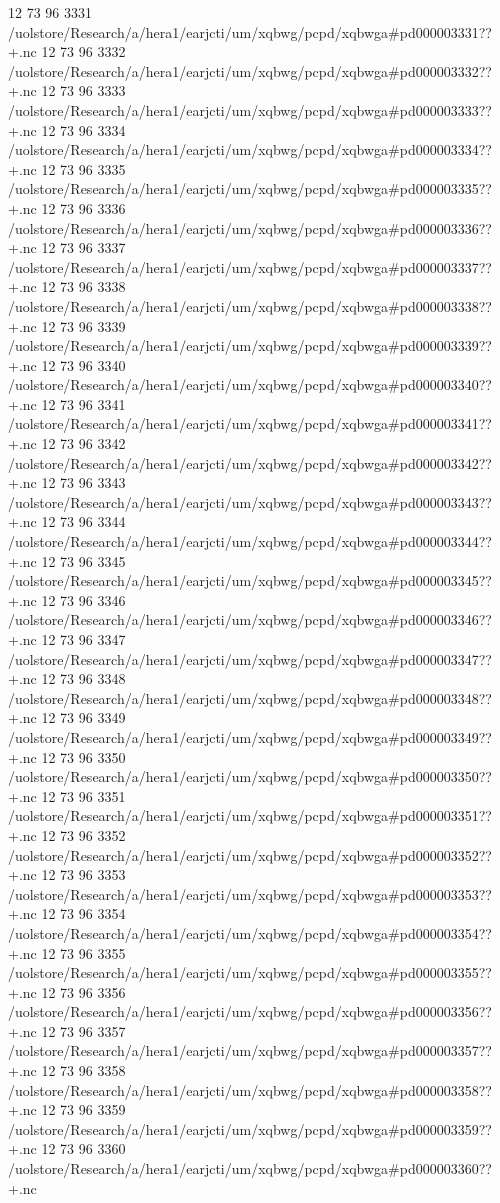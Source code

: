 12 73 96
3331
/uolstore/Research/a/hera1/earjcti/um/xqbwg/pcpd/xqbwga#pd000003331??+.nc
12 73 96
3332
/uolstore/Research/a/hera1/earjcti/um/xqbwg/pcpd/xqbwga#pd000003332??+.nc
12 73 96
3333
/uolstore/Research/a/hera1/earjcti/um/xqbwg/pcpd/xqbwga#pd000003333??+.nc
12 73 96
3334
/uolstore/Research/a/hera1/earjcti/um/xqbwg/pcpd/xqbwga#pd000003334??+.nc
12 73 96
3335
/uolstore/Research/a/hera1/earjcti/um/xqbwg/pcpd/xqbwga#pd000003335??+.nc
12 73 96
3336
/uolstore/Research/a/hera1/earjcti/um/xqbwg/pcpd/xqbwga#pd000003336??+.nc
12 73 96
3337
/uolstore/Research/a/hera1/earjcti/um/xqbwg/pcpd/xqbwga#pd000003337??+.nc
12 73 96
3338
/uolstore/Research/a/hera1/earjcti/um/xqbwg/pcpd/xqbwga#pd000003338??+.nc
12 73 96
3339
/uolstore/Research/a/hera1/earjcti/um/xqbwg/pcpd/xqbwga#pd000003339??+.nc
12 73 96
3340
/uolstore/Research/a/hera1/earjcti/um/xqbwg/pcpd/xqbwga#pd000003340??+.nc
12 73 96
3341
/uolstore/Research/a/hera1/earjcti/um/xqbwg/pcpd/xqbwga#pd000003341??+.nc
12 73 96
3342
/uolstore/Research/a/hera1/earjcti/um/xqbwg/pcpd/xqbwga#pd000003342??+.nc
12 73 96
3343
/uolstore/Research/a/hera1/earjcti/um/xqbwg/pcpd/xqbwga#pd000003343??+.nc
12 73 96
3344
/uolstore/Research/a/hera1/earjcti/um/xqbwg/pcpd/xqbwga#pd000003344??+.nc
12 73 96
3345
/uolstore/Research/a/hera1/earjcti/um/xqbwg/pcpd/xqbwga#pd000003345??+.nc
12 73 96
3346
/uolstore/Research/a/hera1/earjcti/um/xqbwg/pcpd/xqbwga#pd000003346??+.nc
12 73 96
3347
/uolstore/Research/a/hera1/earjcti/um/xqbwg/pcpd/xqbwga#pd000003347??+.nc
12 73 96
3348
/uolstore/Research/a/hera1/earjcti/um/xqbwg/pcpd/xqbwga#pd000003348??+.nc
12 73 96
3349
/uolstore/Research/a/hera1/earjcti/um/xqbwg/pcpd/xqbwga#pd000003349??+.nc
12 73 96
3350
/uolstore/Research/a/hera1/earjcti/um/xqbwg/pcpd/xqbwga#pd000003350??+.nc
12 73 96
3351
/uolstore/Research/a/hera1/earjcti/um/xqbwg/pcpd/xqbwga#pd000003351??+.nc
12 73 96
3352
/uolstore/Research/a/hera1/earjcti/um/xqbwg/pcpd/xqbwga#pd000003352??+.nc
12 73 96
3353
/uolstore/Research/a/hera1/earjcti/um/xqbwg/pcpd/xqbwga#pd000003353??+.nc
12 73 96
3354
/uolstore/Research/a/hera1/earjcti/um/xqbwg/pcpd/xqbwga#pd000003354??+.nc
12 73 96
3355
/uolstore/Research/a/hera1/earjcti/um/xqbwg/pcpd/xqbwga#pd000003355??+.nc
12 73 96
3356
/uolstore/Research/a/hera1/earjcti/um/xqbwg/pcpd/xqbwga#pd000003356??+.nc
12 73 96
3357
/uolstore/Research/a/hera1/earjcti/um/xqbwg/pcpd/xqbwga#pd000003357??+.nc
12 73 96
3358
/uolstore/Research/a/hera1/earjcti/um/xqbwg/pcpd/xqbwga#pd000003358??+.nc
12 73 96
3359
/uolstore/Research/a/hera1/earjcti/um/xqbwg/pcpd/xqbwga#pd000003359??+.nc
12 73 96
3360
/uolstore/Research/a/hera1/earjcti/um/xqbwg/pcpd/xqbwga#pd000003360??+.nc
